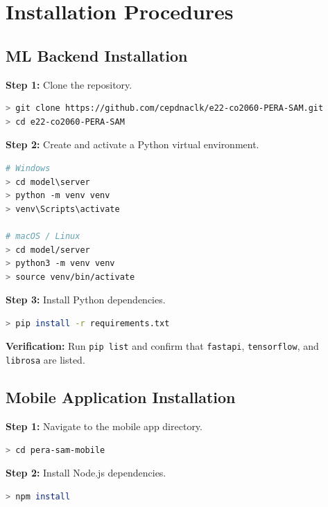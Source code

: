 \documentclass[10pt, a4paper, oneside]{report}
\begin{document}
\section{Installation Procedures}
\label{sec:installation}

\subsection{ML Backend Installation}
\label{subsec:install-backend}

\textbf{Step 1:} Clone the repository.

\begin{lstlisting}[language=bash, caption={Clone repository}]
> git clone https://github.com/cepdnaclk/e22-co2060-PERA-SAM.git
> cd e22-co2060-PERA-SAM
\end{lstlisting}

\textbf{Step 2:} Create and activate a Python virtual environment.

\begin{lstlisting}[language=bash, caption={Virtual environment setup}]
# Windows
> cd model\server
> python -m venv venv
> venv\Scripts\activate

# macOS / Linux
> cd model/server
> python3 -m venv venv
> source venv/bin/activate
\end{lstlisting}

\textbf{Step 3:} Install Python dependencies.

\begin{lstlisting}[language=bash, caption={Install dependencies}]
> pip install -r requirements.txt
\end{lstlisting}

\begin{successbox}
\textbf{ Verification:} Run \texttt{pip list} and confirm that \texttt{fastapi}, \texttt{tensorflow}, and \texttt{librosa} are listed.
\end{successbox}

\subsection{Mobile Application Installation}
\label{subsec:install-mobile}

\textbf{Step 1:} Navigate to the mobile app directory.
\begin{lstlisting}[language=bash]
> cd pera-sam-mobile
\end{lstlisting}

\textbf{Step 2:} Install Node.js dependencies.
\begin{lstlisting}[language=bash]
> npm install
\end{lstlisting}
\end{document}
